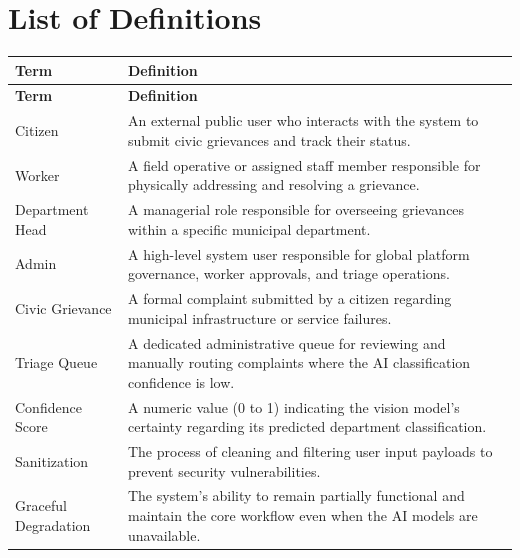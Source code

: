 \chapter*{List of Definitions}
\label{chap:list-definitions}

\small
\begin{xltabular}{\textwidth}{|>{\RaggedRight\arraybackslash}p{0.24\textwidth}|>{\RaggedRight\arraybackslash}X|}
\hline
\textbf{Term} & \textbf{Definition} \\ \hline
\endfirsthead
\hline
\textbf{Term} & \textbf{Definition} \\ \hline
\endhead
Citizen & An external public user who interacts with the system to submit civic grievances and track their status. \\ \hline
Worker & A field operative or assigned staff member responsible for physically addressing and resolving a grievance. \\ \hline
Department Head & A managerial role responsible for overseeing grievances within a specific municipal department. \\ \hline
Admin & A high-level system user responsible for global platform governance, worker approvals, and triage operations. \\ \hline
Civic Grievance & A formal complaint submitted by a citizen regarding municipal infrastructure or service failures. \\ \hline
Triage Queue & A dedicated administrative queue for reviewing and manually routing complaints where the AI classification confidence is low. \\ \hline
Confidence Score & A numeric value (0 to 1) indicating the vision model's certainty regarding its predicted department classification. \\ \hline
Sanitization & The process of cleaning and filtering user input payloads to prevent security vulnerabilities. \\ \hline
Graceful Degradation & The system's ability to remain partially functional and maintain the core workflow even when the AI models are unavailable. \\ \hline
\end{xltabular}
\normalsize
